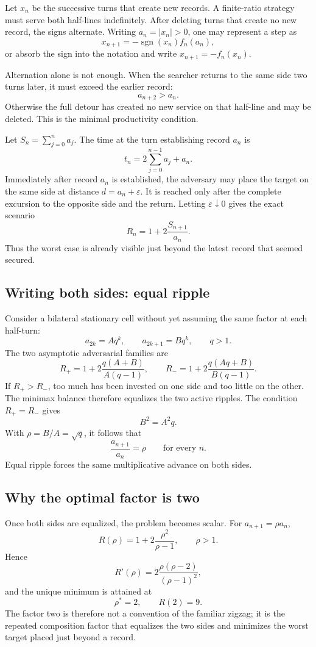 \documentclass[10pt,a4paper]{article}
\newcommand{\sgn}{\operatorname{sgn}}
\theoremstyle{plain}
\theoremstyle{definition}
\theoremstyle{remark}
\begin{document}
Let $x_n$ be the successive turns that create new records. A finite-ratio strategy must serve both half-lines indefinitely. After deleting turns that create no new record, the signs alternate. Writing $a_n=|x_n|>0$, one may represent a step as
\[
  x_{n+1}=-\sgn(x_n)f_n(a_n),
\]
or absorb the sign into the notation and write $x_{n+1}=-f_n(x_n)$.

Alternation alone is not enough. When the searcher returns to the same side two turns later, it must exceed the earlier record:
\[
  a_{n+2}>a_n.
\]
Otherwise the full detour has created no new service on that half-line and may be deleted. This is the minimal productivity condition.

Let $S_n=\sum_{j=0}^n a_j$. The time at the turn establishing record $a_n$ is
\[
  t_n=2\sum_{j=0}^{n-1}a_j+a_n.
\]
Immediately after record $a_n$ is established, the adversary may place the target on the same side at distance $d=a_n+\varepsilon$. It is reached only after the complete excursion to the opposite side and the return. Letting $\varepsilon\downarrow0$ gives the exact scenario
\[
  R_n=1+2\frac{S_{n+1}}{a_n}.
\]
Thus the worst case is already visible just beyond the latest record that seemed secured.

\subsection{Writing both sides: equal ripple}

Consider a bilateral stationary cell without yet assuming the same factor at each half-turn:
\[
  a_{2k}=Aq^k,
  \qquad
  a_{2k+1}=Bq^k,
  \qquad q>1.
\]
The two asymptotic adversarial families are
\[
  R_+=1+2\frac{q(A+B)}{A(q-1)},
  \qquad
  R_-=1+2\frac{q(Aq+B)}{B(q-1)}.
\]
If $R_+>R_-$, too much has been invested on one side and too little on the other. The minimax balance therefore equalizes the two active ripples. The condition $R_+=R_-$ gives
\[
  B^2=A^2q.
\]
With $\rho=B/A=\sqrt q$, it follows that
\[
  \frac{a_{n+1}}{a_n}=\rho
  \qquad\text{for every }n.
\]
Equal ripple forces the same multiplicative advance on both sides.

\subsection{Why the optimal factor is two}

Once both sides are equalized, the problem becomes scalar. For $a_{n+1}=\rho a_n$,
\[
  R(\rho)=1+2\frac{\rho^2}{\rho-1},
  \qquad \rho>1.
\]
Hence
\[
  R'(\rho)=2\frac{\rho(\rho-2)}{(\rho-1)^2},
\]
and the unique minimum is attained at
\[
  \rho^*=2,
  \qquad
  R(2)=9.
\]
The factor two is therefore not a convention of the familiar zigzag; it is the repeated composition factor that equalizes the two sides and minimizes the worst target placed just beyond a record.
\end{document}
